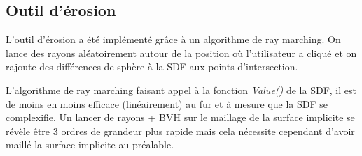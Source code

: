 \subsection {Outil d'érosion}

L'outil d'érosion a été implémenté grâce à un algorithme de ray marching. On lance des rayons aléatoirement autour de la position où l'utilisateur a cliqué
et on rajoute des différences de sphère à la SDF aux points d'intersection. 

L'algorithme de ray marching faisant appel à la fonction \textit{Value()} de la SDF, il est de moins
en moins efficace (linéairement) au fur et à mesure que la SDF se complexifie. Un lancer de rayons + BVH sur le maillage de la surface implicite se révèle être 3 ordres de grandeur
plus rapide mais cela nécessite cependant d'avoir maillé la surface implicite au préalable.
